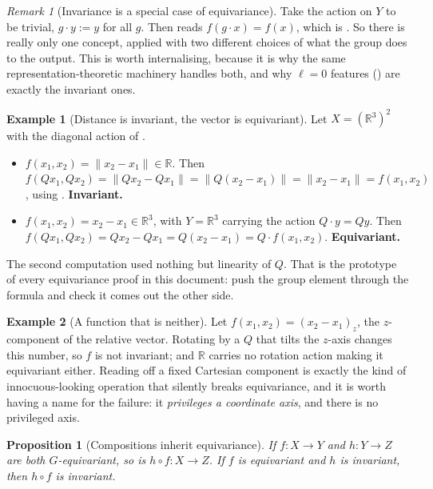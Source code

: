 \documentclass[11pt,a4paper]{report}
\newtheorem{proposition}[proposition]{Proposition}
\theoremstyle{definition}
\newtheorem{example}[example]{Example}
\theoremstyle{remark}
\newtheorem{remark}[remark]{Remark}
\newcommand{\RR}{\mathbb R}
\begin{document}
\begin{remark}[Invariance is a special case of equivariance]
\label{rem:invariance-special-case}
Take the action on $Y$ to be trivial, $g\cdot y := y$ for all $g$. Then
 reads $f(g\cdot x)=f(x)$, which is
. So there is really only one concept, applied
with two different choices of what the group does to the output. This is
worth internalising, because it is why the same representation-theoretic
machinery handles both, and why $\ell=0$ features () are
exactly the invariant ones.
\end{remark}

\begin{example}[Distance is invariant, the vector is equivariant]
\label{ex:dist-invariant}
Let $X=(\RR^3)^2$ with the diagonal action of .
\begin{itemize}[nosep]
\item $f(x_1,x_2)=\|x_2-x_1\|\in\RR$. Then
$f(Qx_1,Qx_2)=\|Qx_2-Qx_1\|=\|Q(x_2-x_1)\|=\|x_2-x_1\|=f(x_1,x_2)$,
using . \textbf{Invariant.}
\item $f(x_1,x_2)=x_2-x_1\in\RR^3$, with $Y=\RR^3$ carrying the action
$Q\cdot y=Qy$. Then $f(Qx_1,Qx_2)=Qx_2-Qx_1=Q(x_2-x_1)=Q\cdot f(x_1,x_2)$.
\textbf{Equivariant.}
\end{itemize}
The second computation used nothing but linearity of $Q$. That is the
prototype of every equivariance proof in this document: push the group
element through the formula and check it comes out the other side.
\end{example}

\begin{example}[A function that is neither]
Let $f(x_1,x_2) = (x_2-x_1)_z$, the $z$-component of the relative vector.
Rotating by a $Q$ that tilts the $z$-axis changes this number, so $f$ is not
invariant; and $\RR$ carries no rotation action making it equivariant
either. Reading off a fixed Cartesian component is exactly the kind of
innocuous-looking operation that silently breaks equivariance, and it is
worth having a name for the failure: it \emph{privileges a coordinate axis},
and there is no privileged axis.
\end{example}

\begin{proposition}[Compositions inherit equivariance]
\label{prop:equivariance-composes}
If $f:X\to Y$ and $h:Y\to Z$ are both $G$-equivariant, so is
$h\circ f:X\to Z$. If $f$ is equivariant and $h$ is invariant, then
$h\circ f$ is invariant.
\end{proposition}
\end{document}
